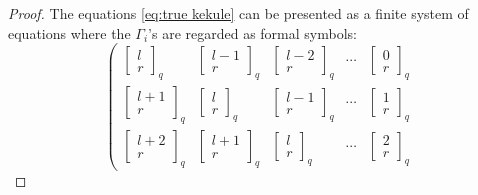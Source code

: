 \documentclass[12pt]{amsart}
\theoremstyle{definition}
\theoremstyle{remark}
\numberwithin{equation}{section}
\numberwithin{figure}{section}
\begin{document}
\begin{proof}
The equations \eqref{eq:true kekule} can be presented as a finite system of equations where the $\Gamma_i$'s are regarded as formal symbols:
  \[ \left(\begin{array}{ccccc}
    \begin{bmatrix}
    l\\
    r
    \end{bmatrix}_q
    &
    \begin{bmatrix}
    l-1\\
    r
    \end{bmatrix}_q
    &
    \begin{bmatrix}
    l-2\\
    r
    \end{bmatrix}_q
    &
    \cdots 
    &
    \begin{bmatrix}
    0\\
    r
    \end{bmatrix}_q
    \\
    \begin{bmatrix}
    l+1\\
    r
    \end{bmatrix}_q
    &
    \begin{bmatrix}
    l\\
    r
    \end{bmatrix}_q
    &
    \begin{bmatrix}
    l-1\\
    r
    \end{bmatrix}_q
    &
    \cdots 
    &
    \begin{bmatrix}
    1\\
    r
    \end{bmatrix}_q
    \\
    \begin{bmatrix}
    l+2\\
    r
    \end{bmatrix}_q
    &
    \begin{bmatrix}
    l+1\\
    r
    \end{bmatrix}_q
    &
    \begin{bmatrix}
    l\\
    r
    \end{bmatrix}_q
    &
    \cdots 
    &
    \begin{bmatrix}
    2\\
    r
    \end{bmatrix}_q

\end{array}\]
\end{proof}
\end{document}
